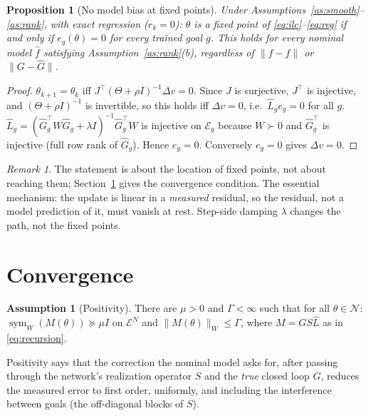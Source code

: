 \documentclass[11pt]{article}
\newtheorem{proposition}[theorem]{Proposition}
\theoremstyle{definition}
\newtheorem{assumption}{Assumption}
\theoremstyle{remark}
\newtheorem{remark}[theorem]{Remark}
\newcommand{\cE}{\mathcal{E}}
\newcommand{\cN}{\mathcal{N}}
\newcommand{\n}[1]{\lVert #1\rVert}
\newcommand{\symW}{\operatorname{sym}_W}
\newcommand{\Ghat}{\widehat G}
\newcommand{\Lhat}{\widehat L}
\newcommand{\fhat}{\widehat f}
\begin{document}
\begin{proposition}[No model bias at fixed points]\label{prop:fixedpoints}
Under Assumptions~\ref{as:smooth}--\ref{as:rank}, with exact regression ($r_k=0$): $\theta$ is a fixed point of
\eqref{eq:ilc}--\eqref{eq:reg} if and only if $e_g(\theta)=0$ for every trained goal $g$. This holds for every nominal
model $\fhat$ satisfying Assumption~\ref{as:rank}(b), regardless of $\n{f-\fhat}$ or $\n{G-\Ghat}$.
\end{proposition}
\begin{proof}
$\theta_{k+1}=\theta_k$ iff $J^\top(\Theta+\rho I)^{-1}\Delta v=0$. Since $J$ is surjective, $J^\top$ is injective,
and $(\Theta+\rho I)^{-1}$ is invertible, so this holds iff $\Delta v=0$, i.e.\ $\Lhat_ge_g=0$ for all $g$. $\Lhat_g=
(\Ghat_g^\top W\Ghat_g+\lambda I)^{-1}\Ghat_g^\top W$ is injective on $\cE_g$ because $W\succ0$ and $\Ghat_g^\top$ is
injective (full row rank of $\Ghat_g$). Hence $e_g=0$. Conversely $e_g=0$ gives $\Delta v=0$.
\end{proof}
\begin{remark}
The statement is about the location of fixed points, not about reaching them; Section~\ref{sec:conv} gives the
convergence condition. The essential mechanism: the update is linear in a \emph{measured} residual, so the residual,
not a model prediction of it, must vanish at rest. Step-side damping $\lambda$ changes the path, not the fixed points.
\end{remark}

\section{Convergence}\label{sec:conv}

\begin{assumption}[Positivity]\label{as:pos}
There are $\mu>0$ and $\Gamma<\infty$ such that for all $\theta\in\cN$: $\symW(M(\theta))\succeq\mu I$ on $\cE^N$ and
$\n{M(\theta)}_W\le\Gamma$, where $M=GS\Lhat$ as in \eqref{eq:recursion}.
\end{assumption}
Positivity says that the correction the nominal model asks for, after passing through the network's realization
operator $S$ and the \emph{true} closed loop $G$, reduces the measured error to first order, uniformly, and including the
interference between goals (the off-diagonal blocks of $S$).
\end{document}
